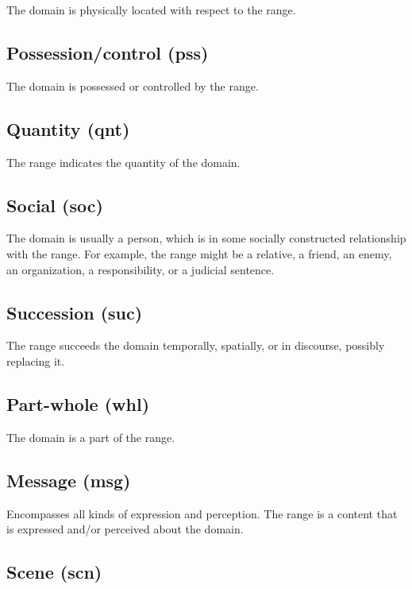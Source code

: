 \documentclass[a4paper]{article}
\begin{document}
The domain is physically located with respect to the range.

\subsection{Possession/control (pss)}

The domain is possessed or controlled by the range.

\subsection{Quantity (qnt)}

The range indicates the quantity of the domain.



\subsection{Social (soc)}

The domain is usually a person, which is in some socially constructed relationship with the range. For example, the range might be a relative, a friend, an enemy, an organization, a responsibility, or a judicial sentence.

\subsection{Succession (suc)}

The range succeeds the domain temporally, spatially, or in discourse, possibly replacing it.

\subsection{Part-whole (whl)}

The domain is a part of the range.

\subsection{Message (msg)}

Encompasses all kinds of expression and perception. The range is a content that is expressed and/or perceived about the domain.

\subsection{Scene (scn)}

\end{document}
